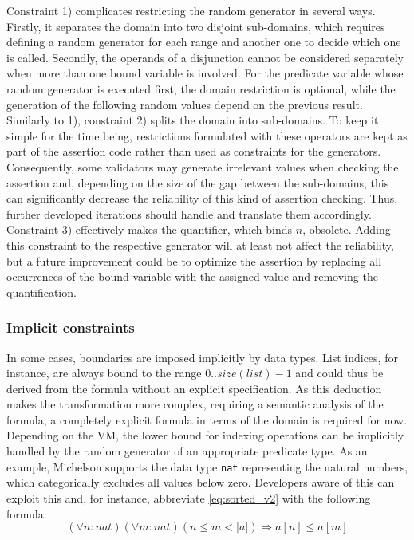 Constraint 1) complicates restricting the random generator in several ways. Firstly, it separates the domain into two disjoint sub-domains, which requires defining a random generator for each range and another one to decide which one is called. Secondly, the operands of a disjunction cannot be considered separately when more than one bound variable is involved. For the predicate variable whose random generator is executed first, the domain restriction is optional, while the generation of the following random values depend on the previous result. Similarly to 1), constraint 2) splits the domain into sub-domains. To keep it simple for the time being, restrictions formulated with these operators are kept as part of the assertion code rather than used as constraints for the generators. Consequently, some validators may generate irrelevant values when checking the assertion and, depending on the size of the gap between the sub-domains, this can significantly decrease the reliability of this kind of assertion checking. Thus, further developed iterations should handle and translate them accordingly.\\
Constraint 3) effectively makes the quantifier, which binds $n$, obsolete. Adding this constraint to the respective generator will at least not affect the reliability, but a future improvement could be to optimize the assertion by replacing all occurrences of the bound variable with the assigned value and removing the quantification.

\subsubsection{Implicit constraints}
In some cases, boundaries are imposed implicitly by data types. List indices, for instance, are always bound to the range $0.. size(list) - 1$ and could thus be derived from the formula without an explicit specification. As this deduction makes the transformation more complex, requiring a semantic analysis of the formula, a completely explicit formula in terms of the domain is required for now. Depending on the VM, the lower bound for indexing operations can be implicitly handled by the random generator of an appropriate predicate type. As an example, Michelson supports the data type \texttt{nat} representing the natural numbers, which categorically excludes all values below zero. Developers aware of this can exploit this and, for instance, abbreviate \eqref{eq:sorted_v2} with the following formula:
\begin{equation}\label{eq:sorted_v2_abbr}
	(\forall n : nat)(\forall m : nat) (n \le m < |a|) \Rightarrow a[n] \leq a[m]
\end{equation}


